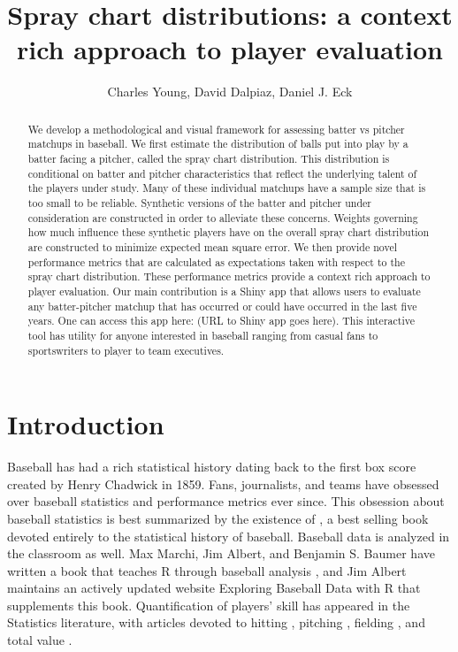 \documentclass[11pt]{article}
\title{Spray chart distributions: a context rich approach to player evaluation}
\author{Charles Young, David Dalpiaz, Daniel J. Eck}
\begin{document}
\maketitle

\begin{abstract}
We develop a methodological and visual framework for assessing batter vs pitcher matchups in baseball. We first estimate the distribution of balls put into play by a batter facing a pitcher, called the spray chart distribution. This distribution is conditional on batter and pitcher characteristics that reflect the underlying talent of the players under study. Many of these individual matchups have a sample size that is too small to be reliable. Synthetic versions of the batter and pitcher under consideration are constructed in order to alleviate these concerns. Weights governing how much influence these synthetic players have on the overall spray chart distribution are constructed to minimize expected mean square error. We then provide novel performance metrics that are calculated as expectations taken with respect to the spray chart distribution. These performance metrics provide a context rich approach to player evaluation. Our main contribution is a Shiny app that allows users to evaluate any batter-pitcher matchup that has occurred or could have occurred in the last five years. One can access this app here: (URL to Shiny app goes here). This interactive tool has utility for anyone interested in baseball ranging from casual fans to sportswriters to player to team executives.
\end{abstract}



\section{Introduction}

Baseball has had a rich statistical history dating back to the first box score created by Henry Chadwick in 1859. Fans, journalists, and teams have obsessed over baseball statistics and performance metrics ever since. This obsession about baseball statistics is best summarized by the existence of \cite{schwarz2004numbers}, a best selling book devoted entirely to the statistical history of baseball. Baseball data is analyzed in the classroom as well. Max Marchi, Jim Albert, and Benjamin S. Baumer have written a book that teaches R through baseball analysis \citep{marchi2019analyzing}, and Jim Albert maintains an actively updated website Exploring Baseball Data with R that supplements this book. 
Quantification of players' skill has appeared in the Statistics literature, with articles devoted to
hitting \citep{berry1999bridging, albert2008streaky, brown2008season, jensen2009hierarchical},
pitching \citep{albert2006pitching, shinya2017pitching},
fielding \citep{jensen2009bayesball, piette2012estimating}, 
and total value \citep{baumer2015openwar}.
\end{document}
